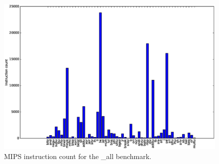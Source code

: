 \documentclass[final]{article}
\begin{document}
\begin{figure}[H]
\centering
\centerline{\includegraphics[width=1.2\textwidth]{resources/bar-chart.eps}}
\caption{MIPS instruction count for the \_all benchmark.}
\label{fig:instruction-count}
\end{figure}
\end{document}
